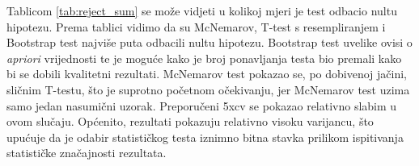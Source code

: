 Tablicom \ref{tab:reject_sum} se može vidjeti u kolikoj mjeri je test odbacio nultu hipotezu. Prema tablici vidimo da su McNemarov, T-test s resempliranjem i Bootstrap test najviše puta odbacili nultu hipotezu. Bootstrap test uvelike ovisi o \textit{apriori} vrijednosti te je moguće kako je broj ponavljanja testa bio premali kako bi se dobili kvalitetni rezultati. McNemarov test pokazao se, po dobivenoj jačini, sličnim T-testu, što je suprotno početnom očekivanju, jer McNemarov test uzima samo jedan nasumični uzorak. Preporučeni 5xcv se pokazao relativno slabim u ovom slučaju. Općenito, rezultati pokazuju relativno visoku varijancu, što upućuje da je odabir statističkog testa iznimno bitna stavka prilikom ispitivanja statističke značajnosti rezultata.

